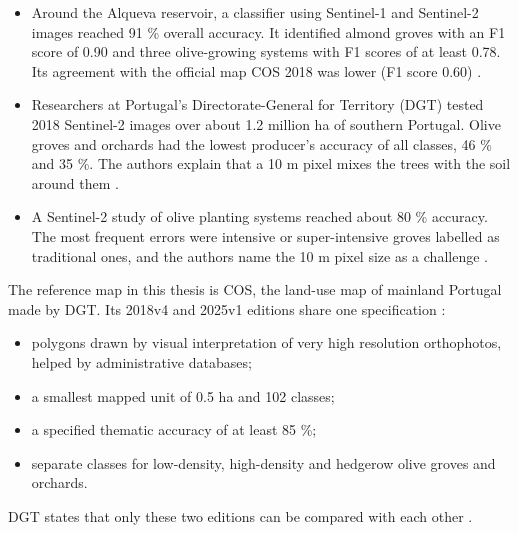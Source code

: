 \begin{itemize}
  \item Around the Alqueva reservoir, a classifier using Sentinel-1 and Sentinel-2 images reached 91 \% overall accuracy. It identified almond groves with an F1 score of 0.90 and three olive-growing systems with F1 scores of at least 0.78. Its agreement with the official map COS 2018 was lower (F1 score 0.60) \cite{R266}.
  \item Researchers at Portugal's Directorate-General for Territory (DGT) tested 2018 Sentinel-2 images over about 1.2 million ha of southern Portugal. Olive groves and orchards had the lowest producer's accuracy of all classes, 46 \% and 35 \%. The authors explain that a 10 m pixel mixes the trees with the soil around them \cite{R269}.
  \item A Sentinel-2 study of olive planting systems reached about 80 \% accuracy. The most frequent errors were intensive or super-intensive groves labelled as traditional ones, and the authors name the 10 m pixel size as a challenge \cite{R267}.

\end{itemize}
The reference map in this thesis is COS, the land-use map of mainland Portugal made by DGT. Its 2018v4 and 2025v1 editions share one specification \cite{R268}:

\begin{itemize}
  \item polygons drawn by visual interpretation of very high resolution orthophotos, helped by administrative databases;
  \item a smallest mapped unit of 0.5 ha and 102 classes;
  \item a specified thematic accuracy of at least 85 \%;
  \item separate classes for low-density, high-density and hedgerow olive groves and orchards.

\end{itemize}
DGT states that only these two editions can be compared with each other \cite{R268}.


